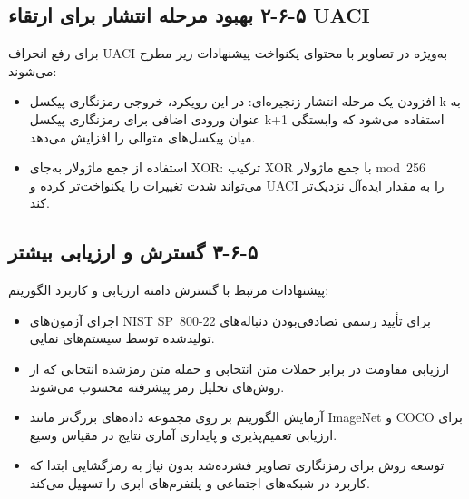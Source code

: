 \subsection{‏۵‏-‏۶‏-‏۲‏ بهبود مرحله انتشار برای ارتقاء UACI}

برای رفع انحراف UACI  به‌ویژه در تصاویر با محتوای یکنواخت پیشنهادات زیر مطرح می‌شوند:

\begin{itemize}
    \item افزودن یک مرحله انتشار زنجیره‌ای: در این رویکرد، خروجی رمزنگاری پیکسل k به عنوان ورودی اضافی برای رمزنگاری پیکسل k+1 استفاده می‌شود که وابستگی میان پیکسل‌های متوالی را افزایش می‌دهد.
\end{itemize}

\begin{itemize}
    \item استفاده از جمع ماژولار به‌جای XOR: ترکیب XOR با جمع ماژولار mod~256 می‌تواند شدت تغییرات را یکنواخت‌تر کرده و UACI را به مقدار ایده‌آل نزدیک‌تر کند.
\end{itemize}

\subsection{‏۵‏-‏۶‏-‏۳‏ گسترش و ارزیابی بیشتر}

پیشنهادات مرتبط با گسترش دامنه ارزیابی و کاربرد الگوریتم:

\begin{itemize}
    \item اجرای آزمون‌های NIST SP~800-22 برای تأیید رسمی تصادفی‌بودن دنباله‌های تولیدشده توسط سیستم‌های نمایی.
\end{itemize}

\begin{itemize}
    \item ارزیابی مقاومت در برابر حملات متن انتخابی و حمله متن رمزشده انتخابی که از روش‌های تحلیل رمز پیشرفته محسوب می‌شوند.
\end{itemize}

\begin{itemize}
    \item آزمایش الگوریتم بر روی مجموعه داده‌های بزرگ‌تر مانند ImageNet و COCO برای ارزیابی تعمیم‌پذیری و پایداری آماری نتایج در مقیاس وسیع.
\end{itemize}

\begin{itemize}
    \item توسعه روش برای رمزنگاری تصاویر فشرده‌شد بدون نیاز به رمزگشایی ابتدا که کاربرد در شبکه‌های اجتماعی و پلتفرم‌های ابری را تسهیل می‌کند.
\end{itemize}

